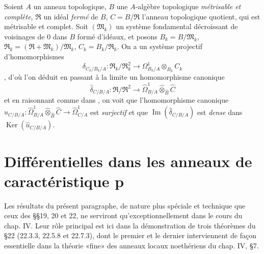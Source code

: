 \begin{env}[20.7.20]
\label{0.20.7.20-fr}
Soient $A$ un anneau topologique, $B$ une $A$-algèbre topologique
\emph{métrisable et complète}, $\mathfrak{R}$ un idéal \emph{fermé} de $B$,
$C=B/\mathfrak{R}$ l'anneau topologique quotient, qui est métrisable et
complet. Soit $(\mathfrak{M}_k)$ un système fondamental décroissant de
voisinages de $0$ dans $B$ formé d'idéaux, et posons
$B_k=B/\mathfrak{M}_k$,
$\mathfrak{R}_k=(\mathfrak{R}+\mathfrak{M}_k)/\mathfrak{M}_k$,
$C_k=B_k/\mathfrak{R}_k$. On a un système projectif d'homomorphismes
\[
  \delta_{C_k/B_k/A}:\mathfrak{R}_k/\mathfrak{R}_k^2\to
  \Omega^1_{B_k/A}\otimes_{B_k}C_k
\]
, d'où l'on déduit en passant à la limite un
homomorphisme canonique
\[
  \widehat\delta_{C/B/A}:\mathfrak{R}/\mathfrak{R}^2\to
  \widehat{\Omega}^1_{B/A}\widehat\otimes_{\widehat B}\widehat C
\]
et en raisonnant comme dans , on voit que l'homomorphisme
canonique
$\widehat u_{C/B/A}:\widehat{\Omega}^1_{B/A}
\widehat\otimes_{\widehat B}\widehat C\to\widehat{\Omega}^1_{C/A}$ est
\emph{surjectif} et que $\operatorname{Im}(\widehat\delta_{C/B/A})$ est
\emph{dense} dans $\operatorname{Ker}(\widehat u_{C/B/A})$.
\end{env}

\section{Différentielles dans les anneaux de caractéristique p}
Les résultats du présent paragraphe, de nature plus spéciale et technique que
ceux des §§19, 20 et 22, ne serviront qu'exceptionnellement dans le cours du
chap. IV. Leur rôle principal est ici dans la démonstration de trois théorèmes
du §22 (22.3.3, 22.5.8 et 22.7.3), dont le premier et le dernier interviennent
de façon essentielle dans la théorie «fine» des anneaux locaux noethériens du
chap. IV, §7.
